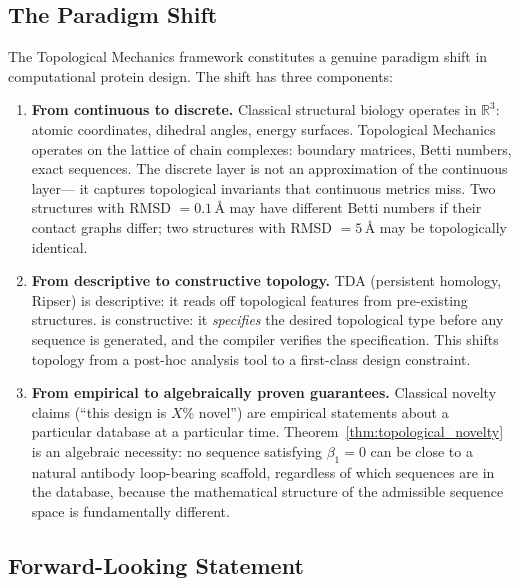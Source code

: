 \subsection{The Paradigm Shift}
\label{subsec:paradigm_shift}

The Topological Mechanics framework constitutes a genuine paradigm shift in
computational protein design.  The shift has three components:

\begin{enumerate}[label=\textbf{S\arabic*.}, leftmargin=1.5cm]
  \item \textbf{From continuous to discrete.}  Classical structural biology
        operates in $\mathbb{R}^3$: atomic coordinates, dihedral angles,
        energy surfaces.  Topological Mechanics operates on the lattice of
        chain complexes: boundary matrices, Betti numbers, exact sequences.
        The discrete layer is not an approximation of the continuous layer---
        it captures topological invariants that continuous metrics miss.
        Two structures with RMSD $= 0.1\,\text{\AA}$ may have different Betti
        numbers if their contact graphs differ; two structures with RMSD
        $= 5\,\text{\AA}$ may be topologically identical.

  \item \textbf{From descriptive to constructive topology.}  TDA (persistent
        homology, Ripser) is descriptive: it reads off topological features
        from pre-existing structures.  \ToposLang{} is constructive: it
        \emph{specifies} the desired topological type before any sequence is
        generated, and the compiler verifies the specification.  This shifts
        topology from a post-hoc analysis tool to a first-class design
        constraint.

  \item \textbf{From empirical to algebraically proven guarantees.}  Classical
        novelty claims (``this design is $X\%$ novel'') are empirical
        statements about a particular database at a particular time.
        Theorem~\ref{thm:topological_novelty} is an algebraic necessity: no
        sequence satisfying $\beta_1 = 0$ can be close to a natural antibody
        loop-bearing scaffold, regardless of which sequences are in the
        database, because the mathematical structure of the admissible sequence
        space is fundamentally different.
\end{enumerate}

\subsection{Forward-Looking Statement}
\label{subsec:forward_looking}


